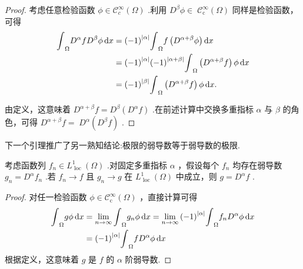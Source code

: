 \begin{proof}
考虑任意检验函数 $\phi  \in  {\mathcal{C}}_{c}^{\infty }\left( \Omega \right)$ .利用 ${D}^{\beta }\phi  \in \; {\mathcal{C}}_{\mathrm{c}}^{\infty }\left( \Omega \right)$ 同样是检验函数，可得
{\setjot[-2]\begin{align*}
    {\int }_{\Omega }{D}^{\alpha }f{D}^{\beta }{\phi \mathop{}\!\mathrm{d} x} &= {\left( -1\right) }^{\left| \alpha \right| }{\int }_{\Omega }f\left( {{D}^{\alpha  + \beta }\phi }\right) {\mathop{}\!\mathrm{d} x}\\
    &= {\left( -1\right) }^{\left| \alpha \right| }{\left( -1\right) }^{\left| \alpha  + \beta \right| }{\int }_{\Omega }\left( {{D}^{\alpha  + \beta }f}\right) {\phi \mathop{}\!\mathrm{d} x}\\
    &= {\left( -1\right) }^{\left| \beta \right| }{\int }_{\Omega }\left( {{D}^{\alpha  + \beta }f}\right) {\phi \mathop{}\!\mathrm{d} x}.
\end{align*}}



由定义，这意味着 ${D}^{\alpha  + \beta }f = {D}^{\beta }\left( {{D}^{\alpha }f}\right)$ .在前述计算中交换多重指标 $\alpha$ 与 $\beta$ 的角色，可得 ${D}^{\alpha  + \beta }f = \; {D}^{\alpha }\left( {{D}^{\beta }f}\right)$ .
\end{proof}

下一个引理推广了另一熟知结论:极限的弱导数等于弱导数的极限.

\begin{lemma}[弱导数的收敛性]\label{lem:weak-derivative-convergence}
考虑函数列 ${f}_{n} \in  {L}_{\text{ loc }}^{1}\left( \Omega \right)$ .对固定多重指标 $\alpha$ ，假设每个 ${f}_{n}$ 均存在弱导数 ${g}_{n} = {D}^{\alpha }{f}_{n}$ .若 ${f}_{n} \rightarrow  f$ 且 ${g}_{n} \rightarrow  g$ 在 ${L}_{\text{ loc }}^{1}\left( \Omega \right)$ 中成立，则 $g = {D}^{\alpha }f$ .
\end{lemma}

\begin{proof}
对任一检验函数 $\phi  \in  {\mathcal{C}}_{\mathrm{c}}^{\infty }\left( \Omega \right)$ ，直接计算可得
{\begin{align*}
    {\int }_{\Omega }{g\phi \mathop{}\!\mathrm{d} x} &= \mathop{\lim }\limits_{{n \rightarrow  \infty }}{\int }_{\Omega }{g}_{n}{\phi \mathop{}\!\mathrm{d} x} = \mathop{\lim }\limits_{{n \rightarrow  \infty }}{\left( -1\right) }^{\left| \alpha \right| }{\int }_{\Omega }{f}_{n}{D}^{\alpha }{\phi \mathop{}\!\mathrm{d} x}\\
    &= {\left( -1\right) }^{\left| \alpha \right| }{\int }_{\Omega }f{D}^{\alpha }{\phi \mathop{}\!\mathrm{d} x}
\end{align*}}
根据定义，这意味着 $g$ 是 $f$ 的 $\alpha$ 阶弱导数.
\end{proof}

